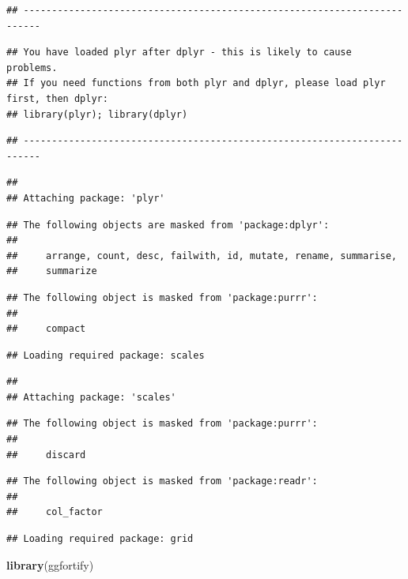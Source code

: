 \documentclass[]{article}
\newenvironment{Shaded}{\begin{snugshade}}{\end{snugshade}}
\newcommand{\KeywordTok}[1]{\textcolor[rgb]{0.13,0.29,0.53}{\textbf{#1}}}
\newcommand{\NormalTok}[1]{#1}
\begin{document}
\begin{verbatim}
## -------------------------------------------------------------------------
\end{verbatim}

\begin{verbatim}
## You have loaded plyr after dplyr - this is likely to cause problems.
## If you need functions from both plyr and dplyr, please load plyr first, then dplyr:
## library(plyr); library(dplyr)
\end{verbatim}

\begin{verbatim}
## -------------------------------------------------------------------------
\end{verbatim}

\begin{verbatim}
## 
## Attaching package: 'plyr'
\end{verbatim}

\begin{verbatim}
## The following objects are masked from 'package:dplyr':
## 
##     arrange, count, desc, failwith, id, mutate, rename, summarise,
##     summarize
\end{verbatim}

\begin{verbatim}
## The following object is masked from 'package:purrr':
## 
##     compact
\end{verbatim}

\begin{verbatim}
## Loading required package: scales
\end{verbatim}

\begin{verbatim}
## 
## Attaching package: 'scales'
\end{verbatim}

\begin{verbatim}
## The following object is masked from 'package:purrr':
## 
##     discard
\end{verbatim}

\begin{verbatim}
## The following object is masked from 'package:readr':
## 
##     col_factor
\end{verbatim}

\begin{verbatim}
## Loading required package: grid
\end{verbatim}

\begin{Shaded}
\begin{Highlighting}[]
\KeywordTok{library}\NormalTok{(ggfortify)}
\end{Highlighting}
\end{Shaded}
\end{document}
